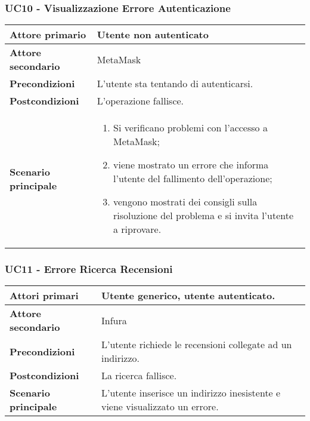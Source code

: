 \subsubsection{UC10 - Visualizzazione Errore Autenticazione}
\label{UC10}
\begin{center}
\renewcommand{\arraystretch}{1.5}
\begin{tabular}{ | m{10em} | m{20em} | }
    \hline
    \textbf{Attore primario} & Utente non autenticato \\
    \hline
    \textbf{Attore secondario} & MetaMask \\
    \hline
    \textbf{Precondizioni} & L'utente sta tentando di autenticarsi. \\
    \hline
    \textbf{Postcondizioni} & L'operazione fallisce. \\
    \hline
    \textbf{Scenario principale} & \begin{enumerate}
        \item Si verificano problemi con l'accesso a MetaMask;
        \item viene mostrato un errore che informa l'utente del fallimento dell'operazione;
        \item vengono mostrati dei consigli sulla risoluzione del problema e si invita
              l'utente a riprovare.
    \end{enumerate} \\
    \hline
   \end{tabular}
\end{center}

\subsubsection{UC11 - Errore Ricerca Recensioni}
\label{UC11}
\begin{center}
\renewcommand{\arraystretch}{1.5}
\begin{tabular}{ | m{10em} | m{20em} | }
    \hline
    \textbf{Attori primari} & Utente generico, utente autenticato. \\
    \hline
    \textbf{Attore secondario} & Infura \\
    \hline
    \textbf{Precondizioni} & L'utente richiede le recensioni collegate ad un indirizzo. \\
    \hline
    \textbf{Postcondizioni} & La ricerca fallisce. \\
    \hline
    \textbf{Scenario principale} & L'utente inserisce un indirizzo inesistente e viene visualizzato un errore. \\
    \hline
   \end{tabular}
\end{center}

